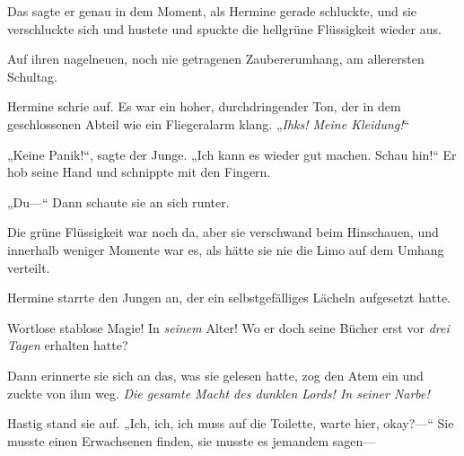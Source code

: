 Das sagte er genau in dem Moment, als Hermine gerade schluckte, und sie verschluckte sich und hustete und spuckte die hellgrüne Flüssigkeit wieder aus.

Auf ihren nagelneuen, noch nie getragenen Zaubererumhang, am allerersten Schultag.

Hermine schrie auf. Es war ein hoher, durchdringender Ton, der in dem geschlossenen Abteil wie ein Fliegeralarm klang. „\emph{Ihks! Meine Kleidung!}“

„Keine Panik!“, sagte der Junge. „Ich kann es wieder gut machen. Schau hin!“ Er hob seine Hand und schnippte mit den Fingern.

„Du—“ Dann schaute sie an sich runter.

Die grüne Flüssigkeit war noch da, aber sie verschwand beim Hinschauen, und innerhalb weniger Momente war es, als hätte sie nie die Limo auf dem Umhang verteilt.

Hermine starrte den Jungen an, der ein selbstgefälliges Lächeln aufgesetzt hatte.

Wortlose stablose Magie! In \emph{seinem} Alter! Wo er doch seine Bücher erst vor \emph{drei Tagen} erhalten hatte?

Dann erinnerte sie sich an das, was sie gelesen hatte, zog den Atem ein und zuckte von ihm weg. \emph{Die gesamte Macht des dunklen Lords! In seiner Narbe!}

Hastig stand sie auf. „Ich, ich, ich muss auf die Toilette, warte hier, okay?—“ Sie musste einen Erwachsenen finden, sie musste es jemandem sagen—

